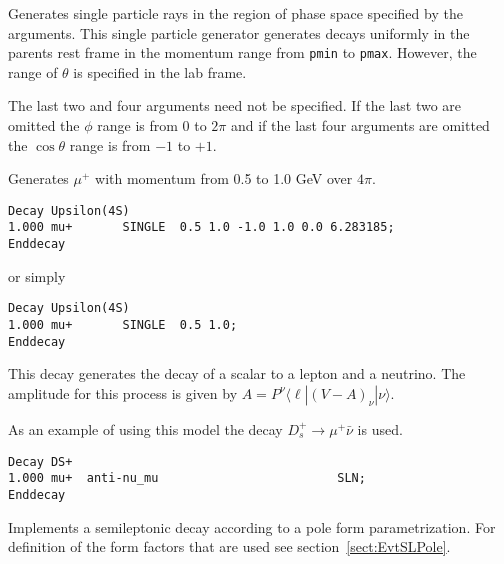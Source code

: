 \label{single}



\Expl
Generates single particle rays in the region of phase space 
specified by the arguments. This single particle generator 
generates decays uniformly in the parents rest frame in 
the momentum range from {\tt pmin} to {\tt pmax}. However,
the range of $\theta$ is specified in the lab frame.

The last two and four arguments need not be specified. If
the last two are omitted the $\phi$ range is from $0$ to $2\pi$
and if the last four arguments are omitted the $\cos\theta$ range
is from $-1$ to $+1$.

\Example 
Generates $\mu^+$ with momentum from 0.5 to 1.0 GeV over $4\pi$.
\begin{verbatim}
Decay Upsilon(4S)
1.000 mu+       SINGLE  0.5 1.0 -1.0 1.0 0.0 6.283185;
Enddecay
\end{verbatim}

or simply

\begin{verbatim}
Decay Upsilon(4S)
1.000 mu+       SINGLE  0.5 1.0;
Enddecay
\end{verbatim}


\label{sln}



\Expl
This decay generates the decay of a scalar to a lepton and a 
neutrino. The amplitude for this process is given by
$A=P^{\nu}\langle \ell | (V-A)_{\nu} | \nu \rangle$.

\Example 
As an example of using this model the decay $D_s^+\rightarrow \mu^+\bar\nu$
is used.
\begin{verbatim}
Decay DS+
1.000 mu+  anti-nu_mu                         SLN;
Enddecay
\end{verbatim}




\label{SLPOLE}



\Expl
Implements a semileptonic decay according to a pole form parametrization.
For definition of the form factors that are used see 
section~\ref{sect:EvtSLPole}.
 
